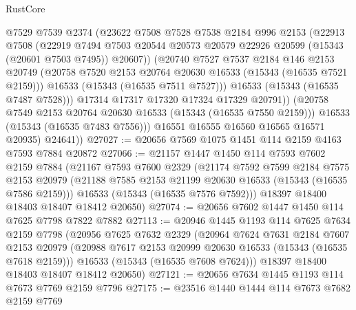 \begin{lexlean}{RustCore}
\begin{coremodule}
                @7529
                @7539
                @2374
                (@23622
                  @7508
                  @7528
                  @7538
                  @2184
                  @996
                  @2153
                  (@22913
                    @7508
                    (@22919
                      @7494
                      @7503
                      @20544
                      @20573
                      @20579
                      @22926
                      @20599
                      (@15343 (@20601 @7503 @7495))
                      @20607))
                  (@20740
                    @7527
                    @7537
                    @2184
                    @146
                    @2153
                    @20749
                    (@20758 @7520 @2153 @20764 @20630 @16533 (@15343 (@16535 @7521 @2159)))
                    @16533
                    (@15343 (@16535 @7511 @7527)))
                  @16533
                  (@15343 (@16535 @7487 @7528)))
                @17314
                @17317
                @17320
                @17324
                @17329
                @20791))
            (@20758 @7549 @2153 @20764 @20630 @16533 (@15343 (@16535 @7550 @2159)))
            @16533
            (@15343 (@16535 @7483 @7556)))
          @16551
          @16555
          @16560
          @16565
          @16571
          @20935)
        @24641))
@27027 := @20656 @7569 @1075 @1451 @114 @2159 @4163 @7593 @7884 @20872
@27066 := @21157
    @1447
    @1450
    @114
    @7593
    @7602
    @2159
    @7884
    (@21167
      @7593
      @7600
      @2329
      (@21174
        @7592
        @7599
        @2184
        @7575
        @2153
        @20979
        (@21188 @7585 @2153 @21199 @20630 @16533 (@15343 (@16535 @7586 @2159)))
        @16533
        (@15343 (@16535 @7576 @7592)))
      @18397
      @18400
      @18403
      @18407
      @18412
      @20650)
@27074 := @20656 @7602 @1447 @1450 @114 @7625 @7798 @7822 @7882
@27113 := @20946
    @1445
    @1193
    @114
    @7625
    @7634
    @2159
    @7798
    (@20956
      @7625
      @7632
      @2329
      (@20964
        @7624
        @7631
        @2184
        @7607
        @2153
        @20979
        (@20988 @7617 @2153 @20999 @20630 @16533 (@15343 (@16535 @7618 @2159)))
        @16533
        (@15343 (@16535 @7608 @7624)))
      @18397
      @18400
      @18403
      @18407
      @18412
      @20650)
@27121 := @20656 @7634 @1445 @1193 @114 @7673 @7769 @2159 @7796
@27175 := @23516
    @1440
    @1444
    @114
    @7673
    @7682
    @2159
    @7769

\end{coremodule}
\end{lexlean}
